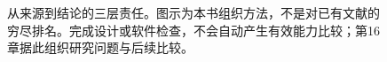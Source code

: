 \begin{figure}[htbp]
\centering

\caption{从来源到结论的三层责任。图示为本书组织方法，不是对已有文献的穷尽排名。完成设计或软件检查，不会自动产生有效能力比较；第16章据此组织研究问题与后续比较。}
\label{fig:survey-axes}
\end{figure}
